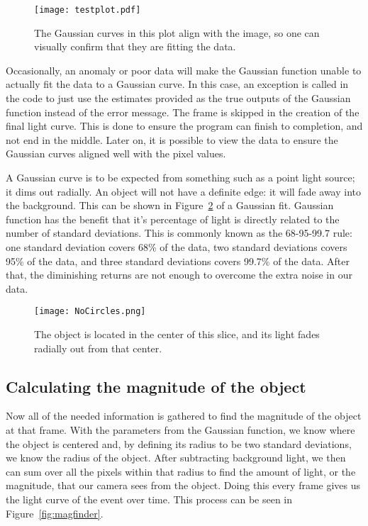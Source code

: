 \begin{figure}[h!]
	\centering
	\texttt{[image: testplot.pdf]}
	\caption{The Gaussian curves in this plot align with the image, so one can visually confirm that they are fitting the data.}
	\label{fig:testplot}
\end{figure}



Occasionally, an anomaly or poor data will make the Gaussian function unable to actually fit the data to a Gaussian curve. In this case, an exception is called in the code to just use the estimates provided as the true outputs of the Gaussian function instead of the error message. The frame is skipped in the creation of the final light curve. This is done to ensure the program can finish to completion, and not end in the middle. Later on, it is possible to view the data to ensure the Gaussian curves aligned well with the pixel values.


A Gaussian curve is to be expected from something such as a point light source; it dims out radially. An object will not have a definite edge: it will fade away into the background. This can be shown in Figure~\ref{fig:NoCircles} of a Gaussian fit. Gaussian function has the benefit that it's percentage of light is directly related to the number of standard deviations. This is commonly known as the 68-95-99.7 rule: one standard deviation covers 68\% of the data, two standard deviations covers 95\% of the data, and three standard deviations covers 99.7\% of the data. After that, the diminishing returns are not enough to overcome the extra noise in our data. 

\begin{figure}[ht!]
	\centering
	\texttt{[image: NoCircles.png]}
	\caption{The object is located in the center of this slice, and its light fades radially out from that center.}
	\label{fig:NoCircles}
\end{figure}

\subsection{Calculating the magnitude of the object}

Now all of the needed information is gathered to find the magnitude of the object at that frame. With the parameters from the Gaussian function, we know where the object is centered and, by defining its radius to be two standard deviations, we know the radius of the object. After subtracting background light, we then can sum over all the pixels within that radius to find the amount of light, or the magnitude, that our camera sees from the object.  Doing this every frame gives us the light curve of the event over time. This process can be seen in Figure~\ref{fig:magfinder}.

